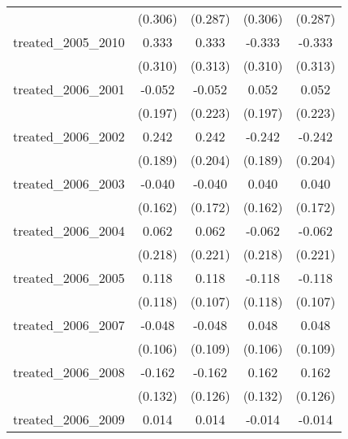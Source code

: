 {\begin{tabular}{l*{4}{c}}
            &     (0.306)         &     (0.287)         &     (0.306)         &     (0.287)         \\
[1em]
treated\_2005\_2010&       0.333         &       0.333         &      -0.333         &      -0.333         \\
            &     (0.310)         &     (0.313)         &     (0.310)         &     (0.313)         \\
[1em]
treated\_2006\_2001&      -0.052         &      -0.052         &       0.052         &       0.052         \\
            &     (0.197)         &     (0.223)         &     (0.197)         &     (0.223)         \\
[1em]
treated\_2006\_2002&       0.242         &       0.242         &      -0.242         &      -0.242         \\
            &     (0.189)         &     (0.204)         &     (0.189)         &     (0.204)         \\
[1em]
treated\_2006\_2003&      -0.040         &      -0.040         &       0.040         &       0.040         \\
            &     (0.162)         &     (0.172)         &     (0.162)         &     (0.172)         \\
[1em]
treated\_2006\_2004&       0.062         &       0.062         &      -0.062         &      -0.062         \\
            &     (0.218)         &     (0.221)         &     (0.218)         &     (0.221)         \\
[1em]
treated\_2006\_2005&       0.118         &       0.118         &      -0.118         &      -0.118         \\
            &     (0.118)         &     (0.107)         &     (0.118)         &     (0.107)         \\
[1em]
treated\_2006\_2007&      -0.048         &      -0.048         &       0.048         &       0.048         \\
            &     (0.106)         &     (0.109)         &     (0.106)         &     (0.109)         \\
[1em]
treated\_2006\_2008&      -0.162         &      -0.162         &       0.162         &       0.162         \\
            &     (0.132)         &     (0.126)         &     (0.132)         &     (0.126)         \\
[1em]
treated\_2006\_2009&       0.014         &       0.014         &      -0.014         &      -0.014         \\

\end{tabular}}
